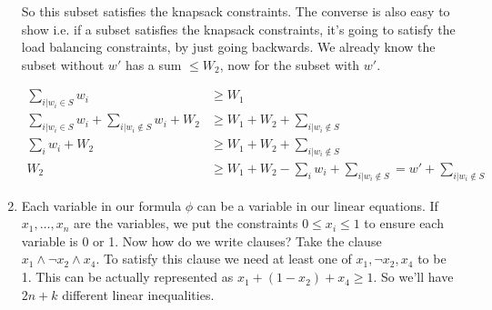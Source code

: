 \documentclass[12pt]{report}
\begin{document}
\begin{enumerate}[label=\textbf{\arabic*.}]
    So this subset satisfies the knapsack constraints. The converse is also easy to show i.e. if a subset satisfies the knapsack constraints, it's
    going to satisfy the load balancing constraints, by just going backwards. We already know the subset without $w'$ has a sum $\leq W_2$, now for the 
    subset with $w'$.

    \begin{align*}
        \sum_{i| w_i \in S} w_i &\geq W_1 \\
        \sum_{i| w_i \in S} w_i + \sum_{i| w_i \notin S} w_i + W_2 &\geq W_1 + W_2 + \sum_{i| w_i \notin S} \\
        \sum_i w_i + W_2 &\geq W_1 + W_2 + \sum_{i| w_i \notin S} \\
        W_2 &\geq W_1 + W_2 - \sum_i w_i + \sum_{i| w_i \notin S} = w' + \sum_{i| w_i \notin S}
    \end{align*}

    \item Each variable in our formula $\phi$ can be a variable in our linear equations. If $x_1, \dots, x_n$ are the variables, we put the 
    constraints $0 \leq x_i \leq 1$ to ensure each variable is 0 or 1. Now how do we write clauses? Take the clause $x_1 \land \lnot x_2 \land x_4$.
    To satisfy this clause we need at least one of $x_1, \lnot x_2, x_4$ to be 1. This can be actually represented as $x_1 + (1 - x_2) + x_4 \geq 1$.
    So we'll have $2n + k$ different linear inequalities.

\end{enumerate}
\end{document}
